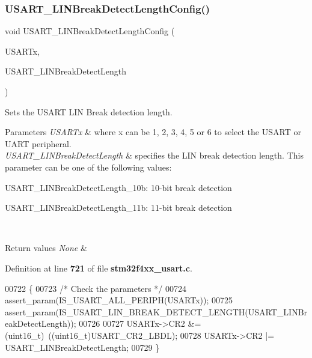 \subsubsection{U\+S\+A\+R\+T\+\_\+\+L\+I\+N\+Break\+Detect\+Length\+Config()}
{\footnotesize\ttfamily void U\+S\+A\+R\+T\+\_\+\+L\+I\+N\+Break\+Detect\+Length\+Config (\begin{DoxyParamCaption}\item[{\textbf{ U\+S\+A\+R\+T\+\_\+\+Type\+Def} $\ast$}]{U\+S\+A\+R\+Tx,  }\item[{uint16\+\_\+t}]{U\+S\+A\+R\+T\+\_\+\+L\+I\+N\+Break\+Detect\+Length }\end{DoxyParamCaption})}



Sets the U\+S\+A\+RT L\+IN Break detection length. 


\begin{DoxyParams}{Parameters}
{\em U\+S\+A\+R\+Tx} & where x can be 1, 2, 3, 4, 5 or 6 to select the U\+S\+A\+RT or U\+A\+RT peripheral. \\
\hline
{\em U\+S\+A\+R\+T\+\_\+\+L\+I\+N\+Break\+Detect\+Length} & specifies the L\+IN break detection length. This parameter can be one of the following values\+: \begin{DoxyItemize}
\item U\+S\+A\+R\+T\+\_\+\+L\+I\+N\+Break\+Detect\+Length\+\_\+10b\+: 10-\/bit break detection \item U\+S\+A\+R\+T\+\_\+\+L\+I\+N\+Break\+Detect\+Length\+\_\+11b\+: 11-\/bit break detection \end{DoxyItemize}
\\
\hline
\end{DoxyParams}

\begin{DoxyRetVals}{Return values}
{\em None} & \\
\hline
\end{DoxyRetVals}


Definition at line \textbf{ 721} of file \textbf{ stm32f4xx\+\_\+usart.\+c}.


\begin{DoxyCode}
00722 \{
00723   \textcolor{comment}{/* Check the parameters */}
00724   assert_param(IS_USART_ALL_PERIPH(USARTx));
00725   assert_param(IS_USART_LIN_BREAK_DETECT_LENGTH(USART\_LINBreakDetectLength));
00726   
00727   USARTx->CR2 &= (uint16\_t)~((uint16\_t)USART_CR2_LBDL);
00728   USARTx->CR2 |= USART\_LINBreakDetectLength;  
00729 \}
\end{DoxyCode}
\mbox{\label{group__USART__Group4_ga9fdd6296f4ca4acdfcbd58bf56bd4185}} 
